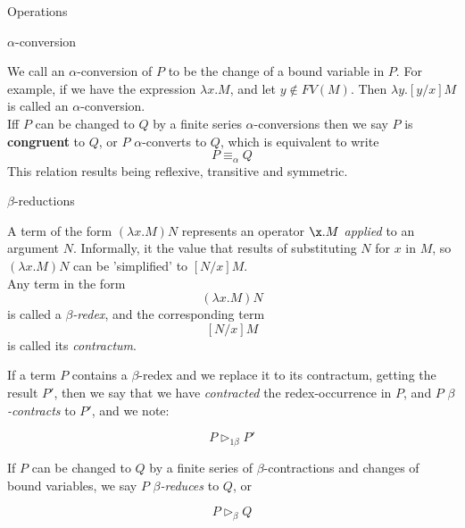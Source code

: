 \documentclass{beamer}
\newcommand{\aconversion}{$\alpha$-conversion}
\newcommand{\aconversions}{$\alpha$-conversions}
\newcommand{\breduction}{$\beta$-reduction}
\newcommand{\breductions}{{\breduction}s}
\renewcommand{\b}{$\beta$}
\begin{document}
\begin{section}{Operations}
\begin{subsection}{\aconversion{}}
\begin{frame}
We call an \aconversion{} of $P$ to be the change of a bound variable in $P$. For example, if we have the expression $\lambda x.M$, and let $y \notin FV(M)$. Then $\lambda y.[y/x]M$ is called an \aconversion{}.\\
Iff $P$ can be changed to $Q$ by a finite series \aconversions{} then we say $P$ is \textbf{congruent} to $Q$, or $P$ $\alpha$-converts to $Q$, which is equivalent to write
$$P \equiv_\alpha Q$$
This relation results being reflexive, transitive and symmetric.

\end{frame}
\end{subsection}
\begin{subsection}{\breductions{}}
\begin{frame}[allowframebreaks]
  
  A term of the form $(\lambda x . M)N$ represents an operator $\x.M$ \textit{applied} to an argument $N$. Informally, it the value that results of substituting $N$ for $x$ in $M$, so $(\lambda x.M)N$ can be 'simplified' to $[N/x]M$.\\[0.5cm]


  Any term in the form $$(\lambda x.M)N$$ is called a \textit{\b{}-redex}, and the corresponding term $$[N/x]M$$ is called its \textit{contractum}. 

  \framebreak
  If a term $P$ contains a \b{}-redex and we replace it to its contractum, getting the result $P'$, then we say that we have \textit{contracted} the redex-occurrence in $P$, and $P$ \textit{\b{}-contracts} to $P'$, and we note:

$$P \rhd_{1\beta} P'$$

If $P$ can be changed to $Q$ by a finite series of \b{}-contractions and changes of bound variables, we say $P$ \textit{\b{}-reduces} to $Q$, or

$$P \rhd_\beta Q$$ 

\end{frame}
\begin{frame}


\end{frame}
\end{subsection}
\end{section}
\end{document}
